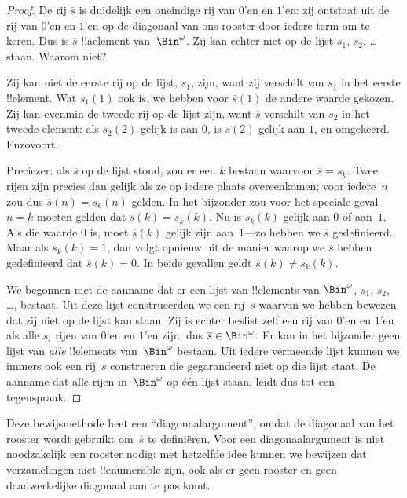 \documentclass[../../../include/open-logic-section]{subfiles}
\begin{document}
\begin{proof}
De rij $\overline{s}$ is duidelijk een oneindige rij van $0$'en en
$1$'en: zij ontstaat uit de rij van $0$'en en $1$'en op de diagonaal
van ons rooster door iedere term om te keren. Dus is $\overline{s}$
!!a{element} van~$\Bin^\omega$. Zij kan echter niet op de lijst $s_1$,
$s_2$, \dots{} staan. Waarom niet?

Zij kan niet de eerste rij op de lijst, $s_1$, zijn, want zij verschilt
van $s_1$ in het eerste !!{element}. Wat $s_1(1)$ ook is, we hebben
voor $\overline{s}(1)$ de andere waarde gekozen. Zij kan evenmin de
tweede rij op de lijst zijn, want $\overline{s}$ verschilt van $s_2$ in
het tweede element: als $s_2(2)$ gelijk is aan $0$, is $\overline{s}(2)$
gelijk aan $1$, en omgekeerd. Enzovoort.

Preciezer: als $\overline{s}$ op de lijst stond, zou er een $k$ bestaan
waarvoor $\overline{s} = s_{k}$. Twee rijen zijn precies dan gelijk als
ze op iedere plaats overeenkomen; voor iedere~$n$ zou dus
$\overline{s}(n) = s_{k}(n)$ gelden. In het bijzonder zou voor het
speciale geval $n = k$ moeten gelden dat $\overline{s}(k) = s_{k}(k)$.
Nu is $s_k(k)$ gelijk aan $0$ of aan~$1$. Als die waarde $0$ is, moet
$\overline{s}(k)$ gelijk zijn aan~$1$---zo hebben we $\overline{s}$
gedefinieerd. Maar als $s_k(k) = 1$, dan volgt opnieuw uit de manier
waarop we $\overline{s}$ hebben gedefinieerd dat $\overline{s}(k) = 0$.
In beide gevallen geldt $\overline{s}(k) \neq
s_{k}(k)$.

We begonnen met de aanname dat er een lijst van !!{element}s van
$\Bin^\omega$, $s_1$, $s_2$, \dots{}, bestaat. Uit deze lijst
construeerden we
een rij~$\overline{s}$ waarvan we hebben bewezen dat zij niet op de
lijst kan staan. Zij is echter beslist zelf een rij van $0$'en en
$1$'en als alle $s_i$ rijen van $0$'en en $1$'en zijn; dus $\overline{s} \in
\Bin^\omega$. Er kan in het bijzonder geen lijst van \emph{alle}
!!{element}s van~$\Bin^\omega$ bestaan. Uit iedere vermeende lijst
kunnen we immers ook een rij~$\overline{s}$ construeren die gegarandeerd
niet op die lijst staat. De aanname dat alle rijen in~$\Bin^\omega$ op
één lijst staan, leidt dus tot een tegenspraak.
\end{proof}

\begin{explain}
Deze bewijsmethode heet een ``diagonaalargument'', omdat de diagonaal van
het rooster wordt gebruikt om~$\overline{s}$ te definiëren. Voor een
diagonaalargument is niet noodzakelijk een rooster nodig: met hetzelfde
idee kunnen we bewijzen dat verzamelingen niet !!{enumerable} zijn, ook
als er geen rooster en geen daadwerkelijke diagonaal aan te pas komt.
\end{explain}
\end{document}
